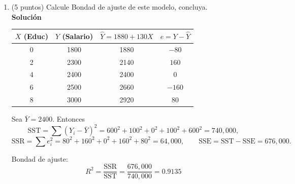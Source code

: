 \documentclass[10pt,a4paper]{article}
\begin{document}
\begin{enumerate}
\begin{enumerate}
\[
\hat\beta_1=\frac{S_{xy}}{S_{xx}}=\frac{5200}{40}=130,
\qquad
\hat\beta_0=\bar Y-\hat\beta_1\,\bar X=2400-130\cdot 4=1880.
\]

\[
\boxed{\;\widehat{Salario}=1880+130\cdot Educ\;}
\]
Siendo el intercepto 1880 y por cada año de educación en promedio aumenta 130 el salario.

    \item (5 puntos) Calcule Bondad de ajuste de este modelo, concluya.
    \\
    \textbf{Solución}
    \\
\begin{center}
\begin{tabular}{|c|c|c|c|}
\toprule
$X$ (Educ) & $Y$ (Salario) & $\hat Y=1880+130X$ & $e=Y-\hat Y$ \\
\midrule
0 & 1800 & 1880 & $-80$ \\
2 & 2300 & 2140 & $160$ \\
4 & 2400 & 2400 & $0$ \\
6 & 2500 & 2660 & $-160$ \\
8 & 3000 & 2920 & $80$ \\
\bottomrule
\end{tabular}
\end{center}


Sea $\bar Y=2400$. Entonces
\[
\text{SST}=\sum (Y_i-\bar Y)^2
=600^2+100^2+0^2+100^2+600^2
=740{,}000,
\]
\[
\text{SSR}=\sum e_i^2
=80^2+160^2+0^2+160^2+80^2
=64{,}000,
\qquad
\text{SSE}=\text{SST}-\text{SSE}=676{,}000.
\]

Bondad de ajuste:
\[
R^2=\frac{\text{SSR}}{\text{SST}}=\frac{676{,}000}{740{,}000}=0.9135
\]
    

\end{enumerate}
\end{enumerate}
\end{document}
